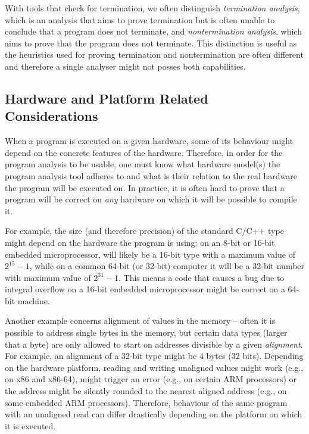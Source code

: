 With tools that check for termination, we often distinguish \emph{termination analysis}, which is an analysis that aims to prove termination but is often unable to conclude that a program does not terminate, and \emph{nontermination analysis}, which aims to prove that the program does not terminate.
This distinction is useful as the heuristics used for proving termination and nontermination are often different and therefore a single analyser might not posses both capabilities.

\subsection{Hardware and Platform Related Considerations}

When a program is executed on a given hardware, some of its behaviour might
depend on the concrete features of the hardware.
Therefore, in order for the program analysis to be usable, one must know what
hardware model(s) the program analysis tool adheres to and what is their
relation to the real hardware the program will be executed on.
In practice, it is often hard to prove that a program will be correct on
\emph{any} hardware on which it will be possible to compile it.

For example, the size (and therefore precision) of the standard C/C++ type
 might depend on the hardware the program is using: on an 8-bit or
16-bit embedded microprocessor,  will likely be a 16-bit type with a
maximum value of $2^{15} - 1$, while on a common 64-bit (or 32-bit) computer it
will be a 32-bit number with maximum value of $2^{31}-1$.
This means a code that causes a bug due to integral overflow on a 16-bit
embedded microprocessor might be correct on a 64-bit machine.

Another example concerns alignment of values in the memory -- often it is
possible to address single bytes in the memory, but certain data types (larger
that a byte) are only allowed to start on addresses divisible by a given
\emph{alignment}.
For example, an alignment of a 32-bit  type might be 4 bytes (32
bits).
Depending on the hardware platform, reading and writing unaligned values might
work (e.g., on x86 and x86-64), might trigger an error (e.g., on certain ARM
processors) or the address might be silently rounded to the nearest
aligned address (e.g., on some embedded ARM processors).
Therefore, behaviour of the same program with an unaligned read can differ
drastically depending on the platform on which it is executed.

